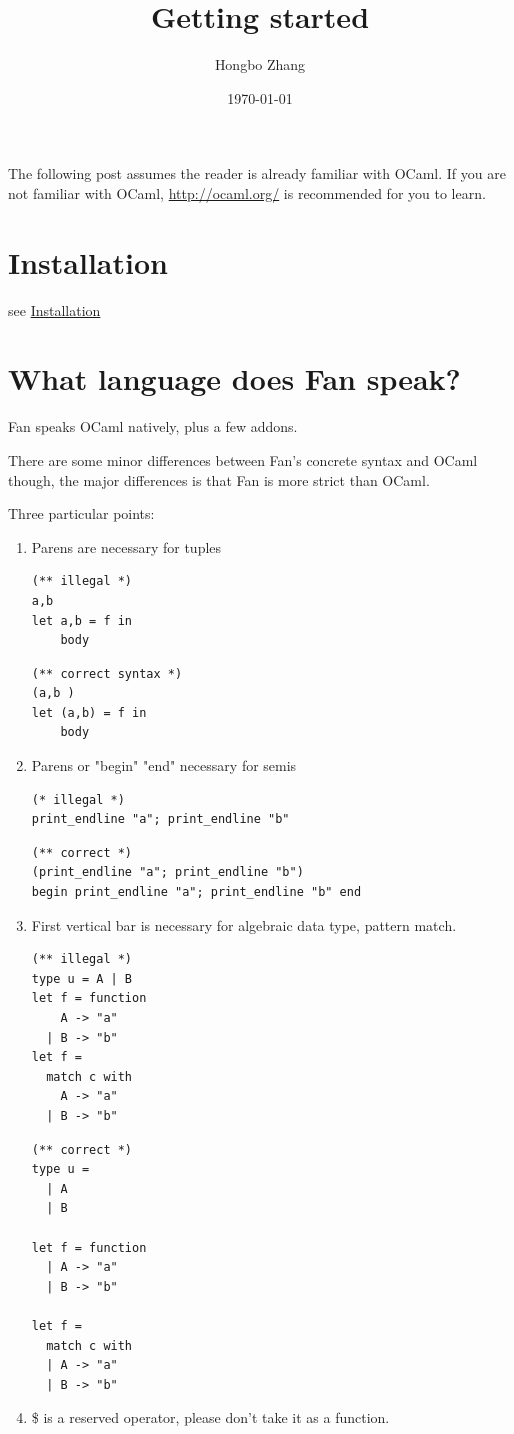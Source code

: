 \documentclass[11pt]{article}
\author{Hongbo Zhang}
\date{\today}
\title{Getting started}
\begin{document}
\maketitle
\tableofcontents

The following post assumes the reader is already familiar with OCaml.
If you are not familiar with OCaml, \url{http://ocaml.org/} is recommended
for you to learn.


\section{Installation}
\label{sec-1}
see \href{install.org}{Installation}

\section{What language does Fan speak?}
\label{sec-2}

Fan speaks OCaml natively, plus a few addons. 

There are some minor differences between Fan's concrete syntax and
OCaml though, the major differences is that Fan is more strict than
OCaml.

Three particular points:
\begin{enumerate}
\item Parens are necessary for tuples
\begin{verbatim}
(** illegal *)
a,b 
let a,b = f in
    body
\end{verbatim}

\begin{verbatim}
(** correct syntax *)
(a,b )
let (a,b) = f in
    body
\end{verbatim}
\item Parens or "begin" "end" necessary for semis
\begin{verbatim}
(* illegal *)
print_endline "a"; print_endline "b"
\end{verbatim}
\begin{verbatim}
(** correct *)
(print_endline "a"; print_endline "b")
begin print_endline "a"; print_endline "b" end
\end{verbatim}
\item First vertical bar is necessary for algebraic data type, pattern
match.
\begin{verbatim}
(** illegal *)
type u = A | B
let f = function
    A -> "a"
  | B -> "b"
let f =
  match c with
    A -> "a"
  | B -> "b"
\end{verbatim}

\begin{verbatim}
(** correct *)
type u =
  | A
  | B 

let f = function
  | A -> "a"
  | B -> "b" 

let f =
  match c with
  | A -> "a"
  | B -> "b"
\end{verbatim}
\item \$ is a reserved operator, please don't take it as a function.
\end{enumerate}
\end{document}
